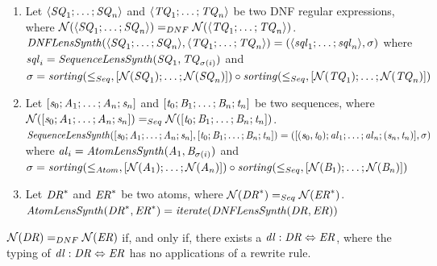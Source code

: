 \documentclass[numbers]{sigplanconf}
\begin{document}
\begin{definition}
  \begin{enumerate}
  \item
    Let
    $\langle\mathit{SQ}_1;\ldots;\mathit{SQ}_n\rangle$
    and
    $\langle\mathit{TQ}_1;\ldots;\mathit{TQ}_n\rangle$
    be two DNF regular expressions, where
    $\mathcal{N}(\langle\mathit{SQ}_1;\ldots;\mathit{SQ}_n\rangle) =_{DNF}
    \mathcal{N}(\langle\mathit{TQ}_1;\ldots;\mathit{TQ}_n\rangle)$.
    $\mathit{DNFLensSynth}(\langle\mathit{SQ}_1;\ldots;\mathit{SQ}_n\rangle,\langle\mathit{TQ}_1;\ldots;\mathit{TQ}_n\rangle)=
    (\langle\mathit{sql}_1;\ldots;\mathit{sql}_n\rangle,\sigma)$
    where
    $\mathit{sql}_i=\mathit{SequenceLensSynth}(\mathit{SQ}_1,\mathit{TQ}_{\sigma(i)})$
    and
    $\sigma=\mathit{sorting}(\leq_{Seq},[ \mathcal{N}(\mathit{SQ}_1);\ldots;\mathcal{N}(\mathit{SQ}_n) ])
    \circ
    \mathit{sorting}(\leq_{Seq},[ \mathcal{N}(\mathit{TQ}_1);\ldots;\mathcal{N}(\mathit{TQ}_n) ])$
  \item
    Let
    $[\mathit{s}_0;\mathit{A}_1;\ldots;\mathit{A}_n;\mathit{s}_n]$
    and
    $[\mathit{t}_0;\mathit{B}_1;\ldots;\mathit{B}_n;\mathit{t}_n]$
    be two sequences, where
    $\mathcal{N}([\mathit{s}_0;\mathit{A}_1;\ldots;\mathit{A}_n;\mathit{s}_n]) =_{Seq}
    \mathcal{N}([\mathit{t}_0;\mathit{B}_1;\ldots;\mathit{B}_n;\mathit{t}_n])$.
    $\mathit{SequenceLensSynth}([\mathit{s}_0;\mathit{A}_1;\ldots;\mathit{A}_n;\mathit{s}_n],[\mathit{t}_0;\mathit{B}_1;\ldots;\mathit{B}_n;\mathit{t}_n])=
    ([(\mathit{s}_0,\mathit{t}_0);\mathit{al}_1;\ldots;\mathit{al}_n;(\mathit{s}_n,\mathit{t}_n)],\sigma)$
    where
    $\mathit{al}_i=\mathit{AtomLensSynth}(\mathit{A}_1,\mathit{B}_{\sigma(i)})$
    and
    $\sigma=\mathit{sorting}(\leq_{Atom},[ \mathcal{N}(\mathit{A}_1);\ldots;\mathcal{N}(\mathit{A}_n) ])
    \circ
    \mathit{sorting}(\leq_{Seq},[ \mathcal{N}(\mathit{B}_1);\ldots;\mathcal{N}(\mathit{B}_n) ])$
  \item
    Let
    ${\mathit{DR}}^*$
    and
    ${\mathit{ER}}^*$
    be two atoms, where
    $\mathcal{N}({\mathit{DR}}^*) =_{Seq}
    \mathcal{N}({\mathit{ER}}^*)$.
    $\mathit{AtomLensSynth}({\mathit{DR}}^*,{\mathit{ER}}^*)=
    \mathit{iterate(\mathit{DNFLensSynth}(\mathit{DR},\mathit{ER}))}$
  \end{enumerate}
\end{definition}

\begin{theorem}
  $\mathcal{N}(\mathit{DR})=_{DNF}\mathcal{N}(\mathit{ER})$
  if, and only
  if, there exists a $\mathit{dl} : \mathit{DR} \Leftrightarrow \mathit{ER}$,
  where the typing of $\mathit{dl}:\mathit{DR}\Leftrightarrow\mathit{ER}$
  has no applications of a rewrite rule.
\end{theorem}
\end{document}

